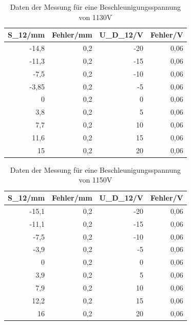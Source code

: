\documentclass[12pt]{scrartcl}
\begin{document}
\begin{table}[htbp]
\caption{Daten der Messung für eine Beschleunigungsspannung von 1130V}
\begin{center}
\begin{tabular}{|r|r|r|r|}
\hline
\multicolumn{1}{|l|}{S\_12/mm} & \multicolumn{1}{l|}{Fehler/mm} & \multicolumn{1}{l|}{U\_D\_12/V} & \multicolumn{1}{l|}{Fehler/V} \\ \hline
-14,8 & 0,2 & -20 & 0,06 \\ \hline
-11,3 & 0,2 & -15 & 0,06 \\ \hline
-7,5 & 0,2 & -10 & 0,06 \\ \hline
-3,85 & 0,2 & -5 & 0,06 \\ \hline
0 & 0,2 & 0 & 0,06 \\ \hline
3,8 & 0,2 & 5 & 0,06 \\ \hline
7,7 & 0,2 & 10 & 0,06 \\ \hline
11,6 & 0,2 & 15 & 0,06 \\ \hline
15 & 0,2 & 20 & 0,06 \\ \hline
\end{tabular}
\end{center}
\label{tab:materialeigenschaften}
\end{table}



\begin{table}[htbp]
\caption{Daten der Messung für eine Beschleunigungsspannung von 1150V}
\begin{center}
\begin{tabular}{|r|r|r|r|}
\hline
\multicolumn{1}{|l|}{S\_12/mm} & \multicolumn{1}{l|}{Fehler/mm} & \multicolumn{1}{l|}{U\_D\_12/V} & \multicolumn{1}{l|}{Fehler/V} \\ \hline
-15,1 & 0,2 & -20 & 0,06 \\ \hline
-11,1 & 0,2 & -15 & 0,06 \\ \hline
-7,5 & 0,2 & -10 & 0,06 \\ \hline
-3,9 & 0,2 & -5 & 0,06 \\ \hline
0 & 0,2 & 0 & 0,06 \\ \hline
3,9 & 0,2 & 5 & 0,06 \\ \hline
7,9 & 0,2 & 10 & 0,06 \\ \hline
12,2 & 0,2 & 15 & 0,06 \\ \hline
16 & 0,2 & 20 & 0,06 \\ \hline
\end{tabular}
\end{center}
\label{tab:materialeigenschaften}
\end{table}
\end{document}
